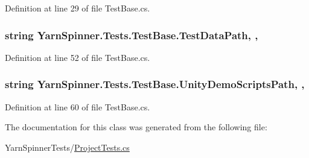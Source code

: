 Definition at line 29 of file Test\-Base.\-cs.

\hypertarget{a00164_aa9b4d902d61adad7165154a265f69aa4}{
\subsubsection[{Test\-Data\-Path}]{\setlength{\rightskip}{0pt plus 5cm}string Yarn\-Spinner.\-Tests.\-Test\-Base.\-Test\-Data\-Path\hspace{0.3cm}{\ttfamily [static]}, {\ttfamily [get]}, {\ttfamily [inherited]}}}\label{a00164_aa9b4d902d61adad7165154a265f69aa4}


Definition at line 52 of file Test\-Base.\-cs.

\hypertarget{a00164_a39922286f6255e4fd0e433a4fc7521c4}{
\subsubsection[{Unity\-Demo\-Scripts\-Path}]{\setlength{\rightskip}{0pt plus 5cm}string Yarn\-Spinner.\-Tests.\-Test\-Base.\-Unity\-Demo\-Scripts\-Path\hspace{0.3cm}{\ttfamily [static]}, {\ttfamily [get]}, {\ttfamily [inherited]}}}\label{a00164_a39922286f6255e4fd0e433a4fc7521c4}


Definition at line 60 of file Test\-Base.\-cs.



The documentation for this class was generated from the following file\-:\begin{DoxyCompactItemize}
\item 
Yarn\-Spinner\-Tests/\hyperlink{a00318}{Project\-Tests.\-cs}\end{DoxyCompactItemize}
